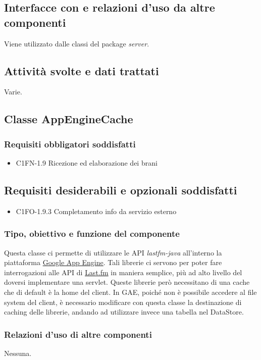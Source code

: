 \subsection*{Interfacce con e relazioni d'uso da altre componenti}
Viene utilizzato dalle classi del package \emph{server}.
\subsection*{Attivit\`a svolte e dati trattati}
Varie.

\subsection{Classe AppEngineCache}
\subsubsection*{Requisiti obbligatori soddisfatti}
\begin{itemize}
    \item C1FN-1.9 Ricezione ed elaborazione dei brani
\end{itemize}
\subsection*{Requisiti desiderabili e opzionali soddisfatti}
\begin{itemize}
    \item C1FO-1.9.3 Completamento info da servizio esterno
\end{itemize}
\subsubsection*{Tipo, obiettivo e funzione del componente}
Questa classe ci permette di utilizzare le API \emph{lastfm-java} all'interno la
piattaforma \underline{Google App Engine}. Tali librerie ci servono per poter
fare interrogazioni alle API di \underline{Last.fm} in maniera semplice, pi\`u ad
alto livello del doversi implementare una servlet. Queste librerie per\`o necessitano di una
cache che di default \`e la home del client. In GAE, poich\'e non \`e possibile
accedere al file system del client, \`e necessario modificare con questa classe
 la destinazione di caching delle librerie, andando ad
utilizzare invece una tabella nel DataStore.
\subsubsection*{Relazioni d'uso di altre componenti}
Nessuna.
